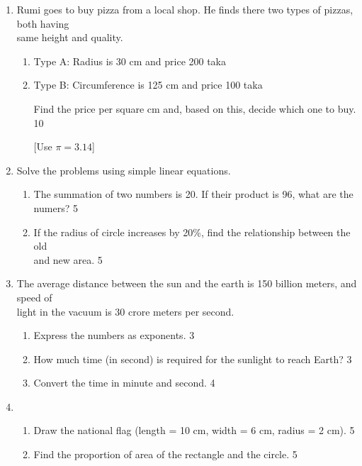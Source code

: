 \documentclass{exam}
\newcommand{\showallanswers}{\par\unvbox\allanswers}
\begin{document}
\begin{center}
\begin{enumerate}
  \item Rumi goes to buy pizza from a local shop. He finds there two types of
  pizzas, both having \\ same height and quality. 
  
  \begin{enumerate}

\item Type A: Radius is 30 cm and price 200 taka
\item Type B: Circumference is 125 cm and price 100 taka

Find the price per square cm and, based on this, decide which one to buy. \hfill 10

[Use $\pi = 3.14$]

\end{enumerate}

  
   \item Solve the problems using simple linear equations. 
  
  \begin{enumerate}
  
  \item The summation of two numbers is 20. If their product is 96, what are the
  numers? \hfill 5
  
  \item If the radius of circle increases by 20\%, find the relationship between
  the old \\ and new area. \hfill 5
  
  \end{enumerate}
  
  \item The average distance between the sun and the earth is 150 billion 
  meters, and speed of \\ light in the vacuum is 30 crore meters per second. 
  
  \begin{enumerate}

  \item Express the numbers as exponents. \hfill 3
  \item How much time (in second) is required for the sunlight to reach Earth? \hfill 3
  \item Convert the time in minute and second. \hfill 4

\end{enumerate}

\item 

\begin{enumerate}

\item Draw the national flag (length = 10 cm, width = 6 cm, radius = 2 cm). \hfill 5
\item Find the proportion of area of the rectangle and the circle. \hfill 5

\end{enumerate}

  \end{enumerate}

\end{center}



\end{document}
